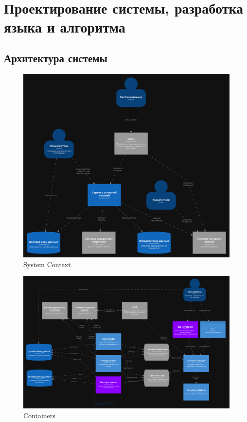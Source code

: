 \section{Проектирование системы, разработка языка и алгоритма}

\subsection{Архитектура системы}

\begin{figure}
  \includegraphics[scale=0.15]{./img/structurizr-SystemLandscape.png}
  \caption{System Context}
  \label{system-context}
\end{figure}

\begin{figure}
  \includegraphics[scale=0.12]{./img/structurizr-Containers.png}
  \caption{Containers}
  \label{containers}
\end{figure}

